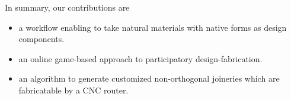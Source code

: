 
In summary, our contributions are
\begin{itemize}
 \item{a workflow enabling to take natural materials with native forms as design components.}
 \item{an online game-based approach to participatory design-fabrication.}
 \item{an algorithm to generate customized non-orthogonal joineries which are fabricatable by a CNC router.}
\end{itemize}




